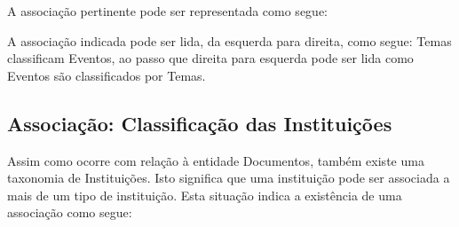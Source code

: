\documentclass[
12pt,		%
openright,	%
twoside,  %
a4paper,			%
chapter=TITLE,		%
english,			%
french,				%
spanish,			%
brazil				%
]{USPSC-classe/USPSC}
\begin{document}
A associa\c{c}\~ao pertinente pode ser representada como segue:
















A associa\c{c}\~ao indicada pode ser lida, da esquerda para direita, como segue: \textquotedbl Temas classificam Eventos\textquotedbl , ao passo que direita para  esquerda pode ser lida como \textquotedbl Eventos s\~ao classificados por Temas\textquotedbl .














\subsection[Associa\c{c}\~ao: Classifica\c{c}\~ao das Institui\c{c}\~oes]{Associa\c{c}\~ao: Classifica\c{c}\~ao das Institui\c{c}\~oes}\label{Associa\c{c}\~ao: Classifica\c{c}\~ao das Institui\c{c}\~oes}
Assim como ocorre com rela\c{c}\~ao \`a entidade \textquotedbl Documentos\textquotedbl , tamb\'em existe uma taxonomia de \textquotedbl Institui\c{c}\~oes\textquotedbl . Isto significa que uma institui\c{c}\~ao pode ser associada a mais de um tipo de institui\c{c}\~ao. Esta situa\c{c}\~ao indica a exist\^encia de uma associa\c{c}\~ao como segue:















\end{document}
